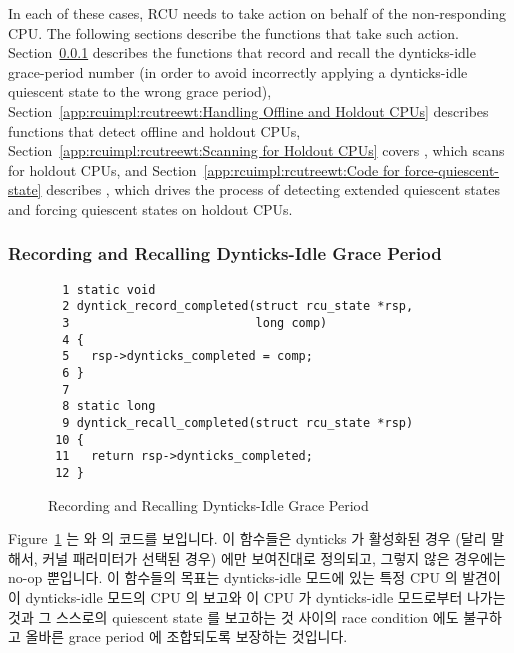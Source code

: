 In each of these cases, RCU needs to take action on behalf of the
non-responding CPU.
The following sections describe the functions that take such action.
Section~\ref{app:rcuimpl:rcutreewt:Recording and Recalling Dynticks-Idle Grace Period}
describes the functions that record and recall the dynticks-idle
grace-period number (in order to avoid incorrectly applying a dynticks-idle
quiescent state to the wrong grace period),
Section~\ref{app:rcuimpl:rcutreewt:Handling Offline and Holdout CPUs}
describes functions that detect offline and holdout CPUs,
Section~\ref{app:rcuimpl:rcutreewt:Scanning for Holdout CPUs}
covers , which scans for holdout CPUs, and
Section~\ref{app:rcuimpl:rcutreewt:Code for force-quiescent-state}
describes , which drives the process of
detecting extended quiescent states and forcing quiescent states on
holdout CPUs.
\fi

\subsubsection{Recording and Recalling Dynticks-Idle Grace Period}
\label{app:rcuimpl:rcutreewt:Recording and Recalling Dynticks-Idle Grace Period}

\begin{figure}[tbp]
{ \scriptsize
\begin{verbatim}
  1 static void
  2 dyntick_record_completed(struct rcu_state *rsp,
  3                          long comp)
  4 {
  5   rsp->dynticks_completed = comp;
  6 }
  7
  8 static long
  9 dyntick_recall_completed(struct rcu_state *rsp)
 10 {
 11   return rsp->dynticks_completed;
 12 }
\end{verbatim}
}
\caption{Recording and Recalling Dynticks-Idle Grace Period}
\label{fig:app:rcuimpl:rcutreewt:Recording and Recalling Dynticks-Idle Grace Period}
\end{figure}

Figure~\ref{fig:app:rcuimpl:rcutreewt:Recording and Recalling Dynticks-Idle Grace Period}
는  와  의 코드를
보입니다.
이 함수들은 dynticks 가 활성화된 경우 (달리 말해서,  커널
패러미터가 선택된 경우) 에만 보여진대로 정의되고, 그렇지 않은 경우에는 no-op
뿐입니다.
이 함수들의 목표는 dynticks-idle 모드에 있는 특정 CPU 의 발견이 이
dynticks-idle 모드의 CPU 의 보고와 이 CPU 가 dynticks-idle 모드로부터 나가는
것과 그 스스로의 quiescent state 를 보고하는 것 사이의 race condition 에도
불구하고 올바른 grace period 에 조합되도록 보장하는 것입니다.
\iffalse

